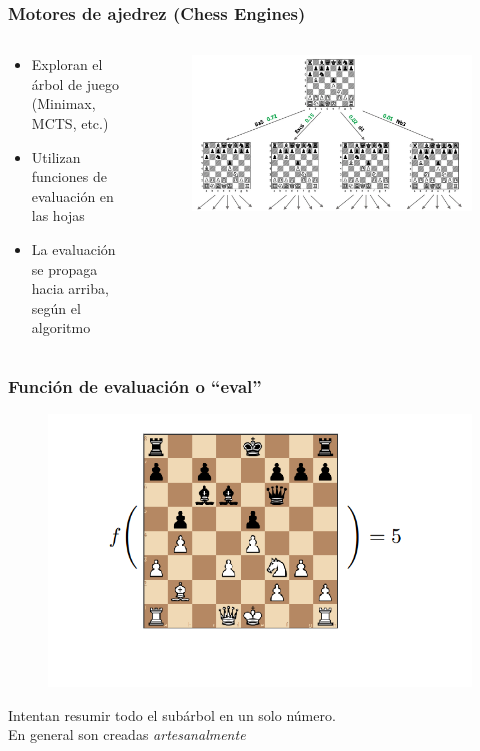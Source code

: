 \begin{frame}
\frametitle{Motores de ajedrez (Chess Engines)}
\begin{columns}
    \begin{column}{0.5\textwidth}
        \begin{itemize}
            \item<1-> Exploran el árbol de juego (Minimax, MCTS, etc.)
            \item<2-> Utilizan funciones de evaluación en las hojas
            \item<3-> La evaluación se propaga hacia arriba, según el algoritmo
        \end{itemize}
    \end{column}
    \begin{column}{0.6\textwidth}
        \begin{figure}
            \centering
            \includegraphics[width=0.9\linewidth]{../assets/slides/chess_tree.png}
        \end{figure}
    \end{column}
\end{columns}
\end{frame}

\begin{frame}
\frametitle{Función de evaluación o \enquote{eval}}
\begin{figure}
    \centering
    \includegraphics[width=0.8\linewidth]{../assets/slides/eval.png}
\end{figure}
\begin{center}
Intentan resumir todo el subárbol en un solo número. \\
En general son creadas \textit{artesanalmente}
\end{center}
\end{frame}

